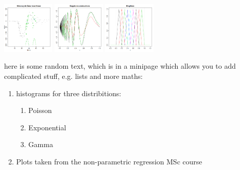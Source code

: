 \documentclass[landscape,final,a0paper]{baposter}
\begin{document}
\begin{poster}
{\begin{minipage}[c]{8cm}
   \includegraphics[width=2.5cm]{mcycle.png}
    \includegraphics[width=2.5cm]{doppler.png}
   \includegraphics[width=2.5cm]{bsplines.png}
\end{minipage}
\begin{minipage}[c]{8cm}
here is some random text, which is in a minipage which allows you to add complicated stuff, e.g. lists and more maths:
\begin{enumerate}
\item histograms for three distribitions:
\begin{enumerate}
\item Poisson
\item Exponential
\item Gamma
\end{enumerate}
\item Plots taken from the non-parametric regression MSc course
\end{enumerate}
\end{minipage}
	
  \vspace{0.5em}
  }

\end{poster}
\end{document}
